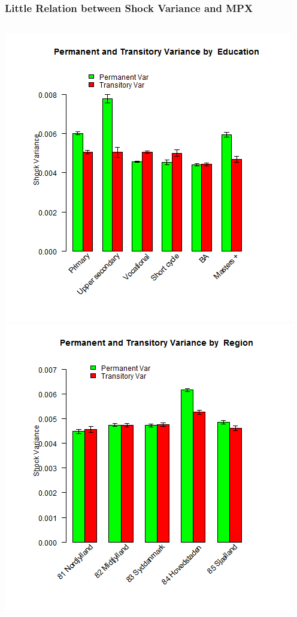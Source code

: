 \documentclass{beamer}
\begin{document}
\frame
{
	\frametitle{Little Relation between Shock Variance and MPX}
	\begin{columns}
		\centering
		\includegraphics[scale=0.2]{../Figures/VarianceByEducation.png}\\
		\includegraphics[scale=0.2]{../Figures/VarianceByRegion.png}

\end{columns}}
\end{document}
